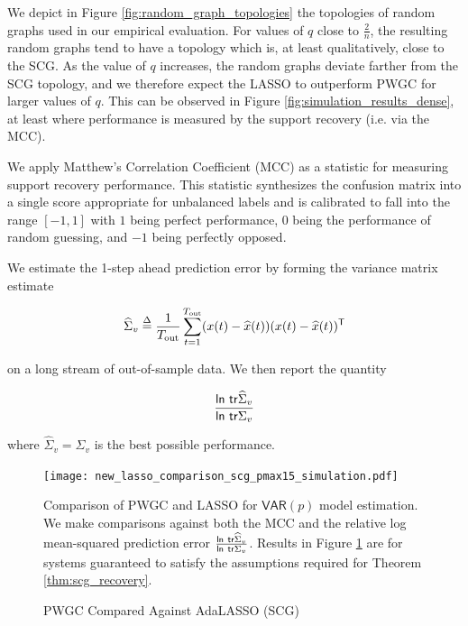 \documentclass[12pt]{article}
\def\VAR{\mathsf{VAR}}  %
\begin{document}
\begin{remark}
  We depict in Figure \ref{fig:random_graph_topologies} the topologies
  of random graphs used in our empirical evaluation.  For values of
  $q$ close to $\frac{2}{n}$, the resulting random graphs tend to have
  a topology which is, at least qualitatively, close to the SCG.  As
  the value of $q$ increases, the random graphs deviate farther from
  the SCG topology, and we therefore expect the LASSO to outperform
  PWGC for larger values of $q$.  This can be observed in Figure
  \ref{fig:simulation_results_dense}, at least where performance is
  measured by the support recovery (i.e. via the MCC).
\end{remark}

\begin{remark}
  We apply Matthew's Correlation Coefficient (MCC)
  \cite{matthews1975comparison} as a statistic for measuring support
  recovery performance.  This statistic synthesizes the confusion
  matrix into a single score appropriate for unbalanced labels and is
  calibrated to fall into the range $[-1, 1]$ with $1$ being perfect
  performance, $0$ being the performance of random guessing, and $-1$
  being perfectly opposed.
\end{remark}

\begin{remark}
  We estimate the 1-step ahead prediction error by forming the variance matrix estimate

  \begin{equation*}
    \widehat{\Sigma}_v \overset{\Delta}{=} \frac{1}{T_{\text{out}}} \sum_{t = 1}^{T_{\text{out}}} (x(t) - \widehat{x}(t))(x(t) - \widehat{x}(t))^{\mathsf{T}}
  \end{equation*}

  on a long stream of out-of-sample data.  We then report the quantity

  \begin{equation*}
    \frac{\mathsf{ln\ } \mathsf{tr } \widehat{\Sigma}_v}{\mathsf{ln\ } \mathsf{tr } \Sigma_v}
  \end{equation*}

  where $\widehat{\Sigma}_v = \Sigma_v$ is the best possible performance.
\end{remark}

\begin{figure}
  \centering
  \caption{PWGC Compared Against AdaLASSO \cite{adaptive_lasso_zou2006} (SCG)}
  \label{fig:simulation_results_comparison1}
  \texttt{[image: new\_lasso\_comparison\_scg\_pmax15\_simulation.pdf]}

  {\scriptsize Comparison of PWGC and LASSO for $\VAR(p)$ model
    estimation.  We make comparisons against both the MCC and the
    relative log mean-squared prediction error
    $\frac{\mathsf{ln\ }\mathsf{tr } \widehat{\Sigma}_v}{\mathsf{ln\ }\mathsf{tr } \Sigma_v}$.  Results
    in Figure \ref{fig:simulation_results_comparison1} are for systems
    guaranteed to satisfy the assumptions required for Theorem
    \ref{thm:scg_recovery}.}
\end{figure}
\end{document}
